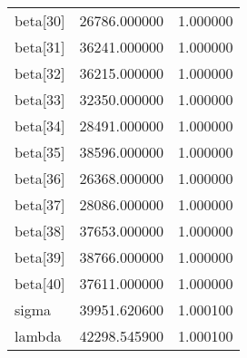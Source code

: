 \begin{tabular}{lrr}
beta[30] & 26786.000000 & 1.000000 \\
beta[31] & 36241.000000 & 1.000000 \\
beta[32] & 36215.000000 & 1.000000 \\
beta[33] & 32350.000000 & 1.000000 \\
beta[34] & 28491.000000 & 1.000000 \\
beta[35] & 38596.000000 & 1.000000 \\
beta[36] & 26368.000000 & 1.000000 \\
beta[37] & 28086.000000 & 1.000000 \\
beta[38] & 37653.000000 & 1.000000 \\
beta[39] & 38766.000000 & 1.000000 \\
beta[40] & 37611.000000 & 1.000000 \\
sigma & 39951.620600 & 1.000100 \\
lambda & 42298.545900 & 1.000100 \\
\bottomrule
\end{tabular}

